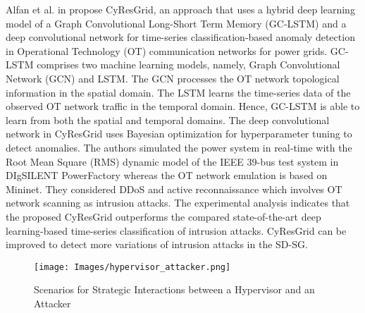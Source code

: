\documentclass[conference]{IEEEtran}
\begin{document}
Alfan et al. in \cite{10017381} propose CyResGrid, an approach that uses a hybrid deep learning model of a Graph Convolutional Long-Short Term Memory (GC-LSTM) and a deep convolutional network for time-series classification-based anomaly detection in Operational Technology (OT) communication networks for power grids. GC-LSTM comprises two machine learning models, namely, Graph Convolutional Network (GCN) and LSTM. The GCN processes the OT network topological information in the spatial domain. The LSTM learns the time-series data of the observed OT network traffic in the temporal domain. Hence, GC-LSTM is able to learn from both the spatial and temporal domains. The deep convolutional network in CyResGrid uses Bayesian optimization for hyperparameter tuning to detect anomalies. The authors simulated the power system in real-time with the Root Mean Square (RMS) dynamic model of the IEEE 39-bus test system in DIgSILENT PowerFactory whereas the OT network emulation is based on Mininet. They considered DDoS and active reconnaissance which involves OT network scanning as intrusion attacks. The experimental analysis indicates that the proposed CyResGrid outperforms the compared state-of-the-art deep learning-based time-series classification of intrusion attacks. CyResGrid can be improved to detect more variations of intrusion attacks in the SD-SG.

\begin{figure}[h]
\centering
\texttt{[image: Images/hypervisor\_attacker.png]}
\caption{Scenarios for Strategic Interactions between a Hypervisor and an Attacker \cite{8746112}}
\label{hypervisor_attacker}
\end{figure}
\end{document}
